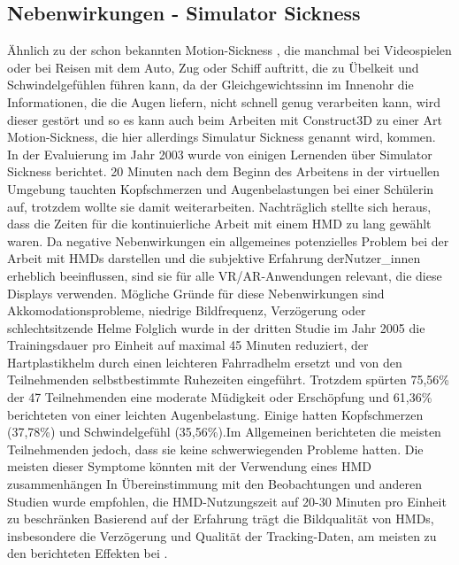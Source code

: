 \documentclass[deutsch]{llncs}
\begin{document}
\subsection{Nebenwirkungen - Simulator Sickness}
Ähnlich zu der schon bekannten Motion-Sickness \cite{motionsickness}, die manchmal bei Videospielen oder bei Reisen mit dem Auto, Zug oder Schiff auftritt, die zu Übelkeit und Schwindelgefühlen führen kann, da der Gleichgewichtssinn im Innenohr die Informationen, die die Augen liefern, nicht schnell genug verarbeiten kann, wird dieser gestört und so es kann auch beim Arbeiten mit Construct3D zu einer Art Motion-Sickness, die hier allerdings
Simulatur Sickness genannt wird, kommen.
\noindent \\
In der Evaluierung im Jahr 2003 wurde von einigen Lernenden über Simulator Sickness berichtet. 20 Minuten nach dem Beginn des Arbeitens in der virtuellen Umgebung tauchten Kopfschmerzen und Augenbelastungen bei einer Schülerin auf, trotzdem wollte sie damit weiterarbeiten. Nachträglich stellte sich heraus, dass die Zeiten für die kontinuierliche Arbeit mit einem HMD zu lang gewählt waren. Da negative Nebenwirkungen ein allgemeines potenzielles Problem bei der Arbeit mit HMDs darstellen und die subjektive Erfahrung derNutzer\_innen erheblich beeinflussen, sind sie für alle VR/AR-Anwendungen relevant, die diese Displays verwenden. Mögliche Gründe für diese Nebenwirkungen sind Akkomodationsprobleme, niedrige Bildfrequenz, Verzögerung oder schlechtsitzende Helme 
Folglich wurde in der dritten Studie im Jahr 2005 die Trainingsdauer pro Einheit auf maximal 45 Minuten reduziert, der Hartplastikhelm durch einen leichteren Fahrradhelm ersetzt und von den Teilnehmenden selbstbestimmte Ruhezeiten eingeführt. Trotzdem spürten 75,56\% der 47 Teilnehmenden eine moderate Müdigkeit oder Erschöpfung und 61,36\% berichteten von einer leichten Augenbelastung. Einige hatten Kopfschmerzen (37,78\%) und Schwindelgefühl (35,56\%).Im Allgemeinen berichteten die meisten Teilnehmenden jedoch, dass sie keine schwerwiegenden Probleme hatten. Die meisten dieser Symptome könnten mit der Verwendung eines HMD zusammenhängen In Übereinstimmung mit den Beobachtungen und anderen Studien wurde empfohlen, die HMD-Nutzungszeit auf 20-30 Minuten pro Einheit zu beschränken  Basierend auf der Erfahrung trägt die Bildqualität von HMDs, insbesondere die Verzögerung und Qualität der Tracking-Daten, am meisten zu den berichteten Effekten bei \cite{Kaufmann_summaryof}.
\end{document}
